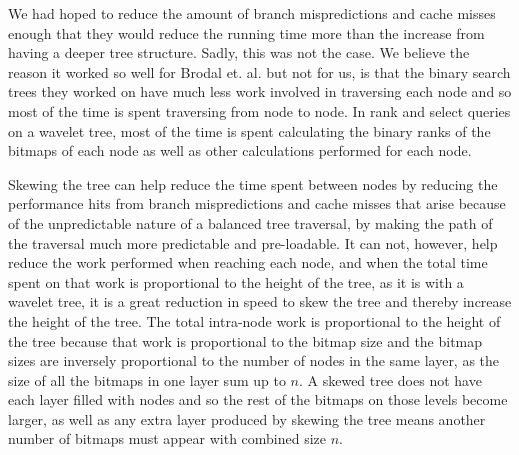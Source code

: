 We had hoped to reduce the amount of branch mispredictions and cache misses enough that they would reduce the running time more than the increase from having a deeper tree structure.
Sadly, this was not the case. We believe the reason it worked so well for Brodal et. al.\cite{gerthSkewedBinarySearchTrees} but not for us, is that the binary search trees they worked on have much less work involved in traversing each node and so most of the time is spent traversing from node to node.
In rank and select queries on a wavelet tree, most of the time is spent calculating the binary ranks of the bitmaps of each node as well as other calculations performed for each node.

Skewing the tree can help reduce the time spent between nodes by reducing the performance hits from branch mispredictions and cache misses that arise because of the unpredictable nature of a balanced tree traversal, by making the path of the traversal much more predictable and pre-loadable.
It can not, however, help reduce the work performed when reaching each node, and when the total time spent on that work is proportional to the height of the tree, as it is with a wavelet tree, it is a great reduction in speed to skew the tree and thereby increase the height of the tree.
The total intra-node work is proportional to the height of the tree because that work is proportional to the bitmap size and the bitmap sizes are inversely proportional to the number of nodes in the same layer, as the size of all the bitmaps in one layer sum up to $n$. A skewed tree does not have each layer filled with nodes and so the rest of the bitmaps on those levels become larger, as well as any extra layer produced by skewing the tree means another number of bitmaps must appear with combined size $n$.


